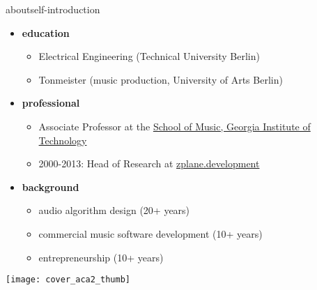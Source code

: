 \begin{frame}{about}{self-introduction}
    \begin{itemize}
        \item   \textbf{education}
            \begin{itemize}
                \item   Electrical Engineering (Technical University Berlin)
                \item   Tonmeister (music production, University of Arts Berlin)
            \end{itemize}
        \bigskip
        \item   \textbf{professional}
            \begin{itemize}
                \item   Associate Professor at the \href{https://music.gatech.edu}{School of Music, Georgia Institute of Technology}
                \item   2000-2013: Head of Research at \href{https://www.zplane.de}{zplane.development}
            \end{itemize}
        \bigskip
        \item   \textbf{background}
            \begin{itemize}
                \item   audio algorithm design (20+ years)
                \item   commercial music software development (10+ years)
                \item   entrepreneurship (10+ years)
            \end{itemize}
    \end{itemize}
    
    \vspace{-30mm}
    \begin{flushright}
                            \texttt{[image: cover\_aca2\_thumb]}
    \end{flushright}

\end{frame}

